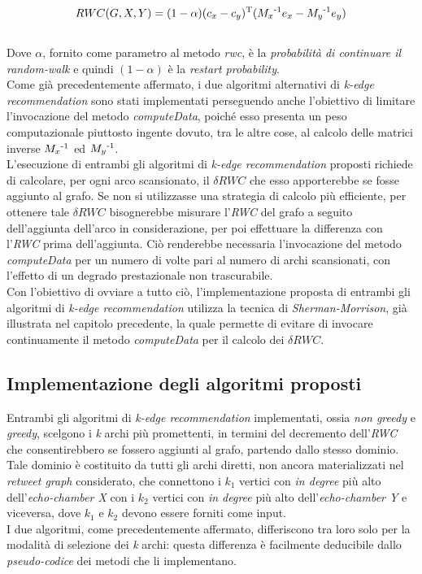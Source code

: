 \\
\begin{equation}
RWC(G,X,Y) = (1 - \alpha)(c_x - c_y)\textsuperscript{T}(M_x\textsuperscript{-1}e_x - M_y\textsuperscript{-1}e_y)
\end{equation}
\\
Dove $\alpha$, fornito come parametro al metodo \textit{rwc}, è la \textit{probabilità di continuare il random-walk} e quindi $(1-\alpha)$ è la \textit{restart probability}. 
\\Come già precedentemente affermato, i due algoritmi alternativi di \textit{k-edge recommendation} sono stati implementati perseguendo anche l'obiettivo di limitare l'invocazione del metodo \textit{computeData}, poiché esso presenta un peso computazionale piuttosto ingente dovuto, tra le altre cose, al calcolo delle matrici inverse  $M_x\textsuperscript{-1}$ ed $M_y\textsuperscript{-1}$. 
\\L'esecuzione di entrambi gli algoritmi di \textit{k-edge recommendation} proposti richiede di calcolare, per ogni arco scansionato, il \textit{$\delta RWC$} che esso apporterebbe se fosse aggiunto al grafo. Se non si utilizzasse una strategia di calcolo più efficiente, per ottenere tale \textit{$\delta RWC$} bisognerebbe misurare l'\textit{RWC} del grafo a seguito dell'aggiunta dell'arco in considerazione, per poi effettuare la differenza con l'\textit{RWC} prima dell'aggiunta. Ciò renderebbe necessaria l'invocazione del metodo \textit{computeData} per un numero di volte pari al numero di archi scansionati, con l'effetto di un degrado prestazionale non trascurabile. \\Con l'obiettivo di ovviare a tutto ciò, l'implementazione proposta di entrambi gli algoritmi di \textit{k-edge recommendation} utilizza la tecnica di \textit{Sherman-Morrison}, già illustrata nel capitolo precedente, la quale permette di evitare di invocare continuamente il metodo \textit{computeData} per il calcolo dei \textit{$\delta RWC$}. 

\subsection{Implementazione degli algoritmi proposti}
Entrambi gli algoritmi di \textit{k-edge recommendation} implementati, ossia \textit{non greedy} e \textit{greedy}, scelgono i \textit{k} archi più promettenti, in termini del decremento dell'\textit{RWC} che consentirebbero se fossero aggiunti al grafo, partendo dallo stesso dominio. Tale dominio è costituito da tutti gli archi diretti, non ancora materializzati nel \textit{retweet graph} considerato, che connettono i \textit{$k_1$} vertici con \textit{in degree} più alto dell'\textit{echo-chamber X} con i \textit{$k_2$} vertici con \textit{in degree} più alto dell'\textit{echo-chamber Y} e viceversa, dove \textit{$k_1$} e \textit{$k_2$} devono essere forniti come input. 
\\I due algoritmi, come precedentemente affermato, differiscono tra loro solo per la modalità di selezione dei \textit{k} archi: questa differenza è facilmente deducibile dallo \textit{pseudo-codice} dei metodi che li implementano.

